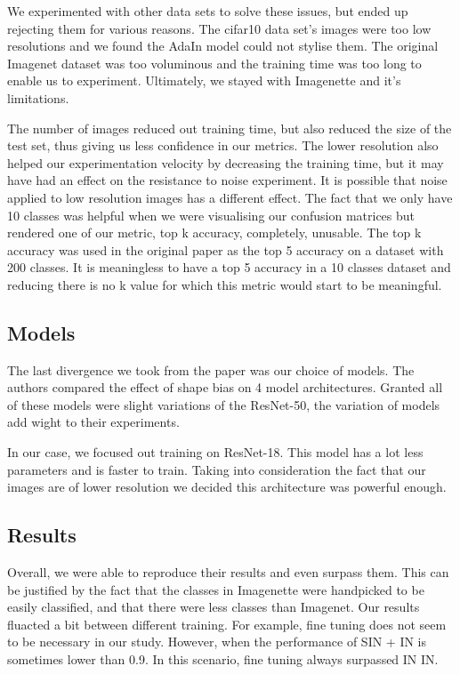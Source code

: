 \documentclass{article}
\begin{document}
\noindent
We experimented with other data sets to solve these issues, but ended up rejecting them for various reasons. The cifar10 data set's images were too low resolutions and we found the AdaIn model could not stylise them.
The original Imagenet dataset was too voluminous and the training time was too long to enable us to experiment.
Ultimately, we stayed with Imagenette and it's limitations. \medskip \par 

\noindent
The number of images reduced out training time, but also reduced the size of the test set, thus giving us less confidence in our metrics.
The lower resolution also helped our experimentation velocity by decreasing the training time, but it may have had an effect on the resistance to noise experiment. It is possible that noise applied to low resolution images has a different effect.
The fact that we only have 10 classes was helpful when we were visualising our confusion matrices but rendered one of our metric, top k accuracy, completely, unusable. The top k accuracy was used in the original paper as the top 5 accuracy on a dataset with 200 classes. It is meaningless to have a top 5 accuracy in a 10 classes dataset and reducing there is no k value for which this metric would start to be meaningful.

\subsection{Models}

The last divergence we took from the paper was our choice of models. The authors compared the effect of shape bias on 4 model architectures. Granted all of these models were slight variations of the ResNet-50, the variation of models add wight to their experiments.

In our case, we focused out training on ResNet-18. This model has a lot less parameters and is faster to train. Taking into consideration the fact that our images are of lower resolution we decided this architecture was powerful enough.

\subsection{Results}

Overall, we were able to reproduce their results and
even surpass them. This can be justified by the fact that the classes
in Imagenette were handpicked to be easily classified, and that there were less 
classes than Imagenet.
Our results fluacted a bit between different training. For example, fine tuning does not seem to be necessary 
in our study. However, when the performance of SIN + IN is sometimes lower than 0.9. In this scenario, fine tuning
always surpassed IN \texorpdfstring{\textrightarrow} .IN. \medskip \par 
\end{document}
